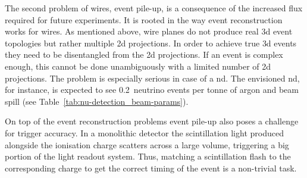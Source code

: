 The second problem of wires, event pile-up, is a consequence of the increased flux required for future experiments.
It is rooted in the way event reconstruction works for wires.
As mentioned above, wire planes do not produce real \gls{3d} event topologies but rather multiple \gls{2d} projections.
In order to achieve true \gls{3d} events they need to be disentangled from the \gls{2d} projections.
If an event is complex enough, this cannot be done unambiguously with a limited number of \gls{2d} projections.
The problem is especially serious in case of a \gls{nd}.
The envisioned \dune{} \gls{nd}, for instance, is expected to see \num{0.2}~neutrino events per tonne of argon and beam spill (see Table~\ref{tab:nu-detection_beam-params}).

On top of the event reconstruction problems event pile-up also poses a challenge for trigger accuracy.
In a monolithic detector the scintillation light produced alongside the ionisation charge scatters across a large volume, triggering a big portion of the light readout system.
Thus, matching a scintillation flash to the corresponding charge to get the correct timing of the event is a non-trivial task.